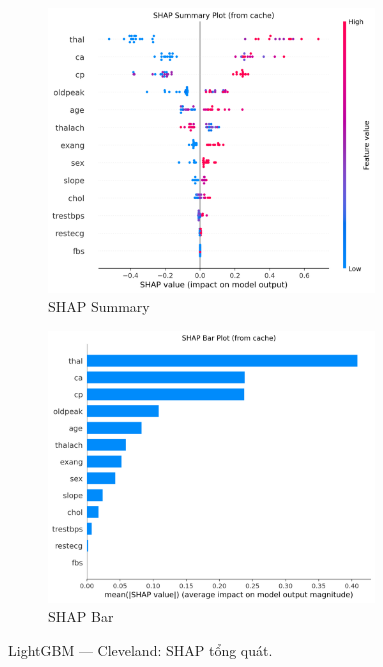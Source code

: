 \begin{figure}[H]
\centering
\begin{subfigure}[b]{0.48\textwidth}
\centering
\includegraphics[width=0.95\textwidth]{Result/cleveland_dataset/LightGBM/SHAP/Summary.png}
\caption{SHAP Summary}
\label{fig:lgbm_clev_shap_summary}
\end{subfigure}\hfill
\begin{subfigure}[b]{0.48\textwidth}
\centering
\includegraphics[width=0.95\textwidth]{Result/cleveland_dataset/LightGBM/SHAP/Bar.png}
\caption{SHAP Bar}
\label{fig:lgbm_clev_shap_bar}
\end{subfigure}
\caption{LightGBM — Cleveland: SHAP tổng quát.}
\label{fig:lgbm_clev_shap_overview}
\end{figure}

